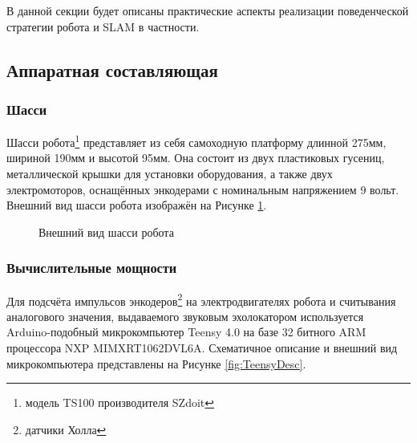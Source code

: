 \documentclass[12pt,a4paper]{scrartcl}
\begin{document}
			В данной секции будет описаны практические аспекты реализации поведенческой стратегии робота и SLAM в частности.
			\subsection{Аппаратная составляющая}
				\subsubsection{Шасси}
					Шасси робота\footnote{модель TS100 производителя SZdoit} представляет из себя самоходную платформу длинной 275мм, шириной 190мм и высотой 95мм. Она состоит из двух пластиковых гусениц, металлической крышки для установки оборудования, а также двух электромоторов, оснащённых энкодерами с номинальным напряжением 9 вольт\cite{bib:TS100Desc}. Внешний вид шасси робота изображён на Рисунке \ref{fig:RobotChassis}.

					\begin{figure}[h]
						\caption{Внешний вид шасси робота}
						\label{fig:RobotChassis}
					\end{figure}				
					
				\subsubsection{Вычислительные мощности}
					Для подсчёта импульсов энкодеров\footnote{датчики Холла} на электродвигателях робота и считывания аналогового значения, выдаваемого звуковым эхолокатором используется Arduino-подобный микрокомпьютер Teensy 4.0 на базе 32 битного ARM процессора NXP MIMXRT1062DVL6A\cite{bib:TeensyDesc}. Схематичное описание и внешний вид микрокомпьютера представлены на Рисунке \ref{fig:TeensyDesc}.
					
\end{document}
